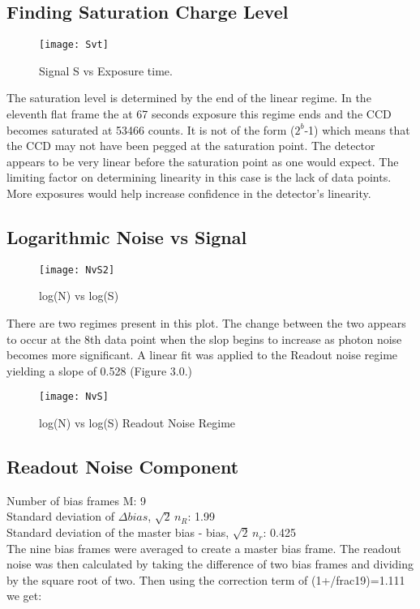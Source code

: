 \documentclass{article}
\begin{document}
\subsection{Finding Saturation Charge Level}
\begin{figure}[h]
\texttt{[image: Svt]} %
\caption{Signal S vs Exposure time.}
\end{figure}
The saturation level is determined by the end of the linear regime. In the eleventh flat frame the at 67 seconds exposure this regime ends and the CCD becomes saturated at 53466 counts. It is not of the form ($2^b$-1) which means that the CCD may not have been pegged at the saturation point. The detector appears to be very linear before the saturation point as one would expect. The limiting factor on determining linearity in this case is the lack of data points. More exposures would help increase confidence in the detector's linearity.

\subsection{Logarithmic Noise vs Signal}
\begin{figure}
\texttt{[image: NvS2]} %
\caption{log(N) vs log(S)}
\end{figure}
There are two regimes present in this plot. The change between the two appears to occur at the 8th data point when the slop begins to increase as photon noise becomes more significant. A linear fit was applied to the Readout noise regime yielding a slope of 0.528 (Figure 3.0.)\\

\begin{figure}
\texttt{[image: NvS]} %
\caption{log(N) vs log(S) Readout Noise Regime}
\end{figure}


\subsection{Readout Noise Component}
Number of bias frames M: 9 \\
Standard deviation of $\Delta bias$, $\sqrt{2} \, n_R$: 1.99 \\
Standard deviation of the master bias - bias, $\sqrt{2} \, n_r$: 0.425 \\

The nine bias frames were averaged to create a master bias frame. The readout noise was then calculated by taking the difference of two bias frames and dividing by the square root of two. Then using the correction term of (1+/frac{1}{9})=1.111 we get:\\
\end{document}

